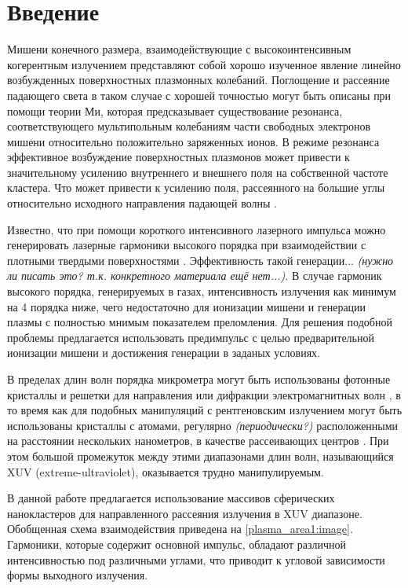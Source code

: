 \section{Введение}

Мишени конечного размера, взаимодействующие с высокоинтенсивным когерентным излучением представляют собой хорошо изученное явление линейно возбужденных 
поверхностных плазмонных колебаний. Поглощение и рассеяние падающего света в таком случае с хорошей точностью могут быть описаны при помощи теории Ми, которая предсказывает существование резонанса, соответствующего мультипольным колебаниям части свободных электронов мишени относительно положительно заряженных ионов. В режиме резонанса эффективное возбуждение поверхностных плазмонов может привести к значительному усилению внутреннего и внешнего 
поля на собственной частоте кластера. Что может привести к усилению поля, рассеянного на большие углы относительно исходного направления падающей волны \cite{andreev_lecz}.

Известно, что при помощи короткого интенсивного лазерного импульса можно генерировать лазерные гармоники высокого порядка при взаимодействии с плотными твердыми поверхностями \cite{teubner_gibbon_hoh}. Эффективность такой генерации... \textit{(нужно ли писать это? т.к. конкретного материала ещё нет...)}. В случае гармоник высокого порядка, генерируемых в газах, интенсивность излучения как минимум на 4 порядка ниже, чего недостаточно для ионизации мишени и генерации плазмы с полностью мнимым показателем преломления. Для решения подобной проблемы предлагается использовать предимпульс с целью предварительной ионизации мишени и достижения генерации в заданых условиях. 

В пределах длин волн порядка микрометра могут быть использованы фотонные кристаллы и решетки для направления или дифракции электромагнитных волн \cite{lin_zhang}, в то время как для подобных манипуляций с рентгеновским излучением могут быть использованы кристаллы с атомами, регулярно \textit{(периодически?)} расположенными на расстоянии нескольких нанометров, в качестве рассеивающих центров \cite{batterman_cole}. При этом большой промежуток между этими диапазонами длин волн, называющийся XUV (extreme-ultraviolet), оказывается трудно манипулируемым.

В данной работе предлагается использование массивов сферических нанокластеров для направленного рассеяния излучения в XUV диапазоне. Обобщенная схема взаимодействия приведена на \autoref{plasma_area1:image}. Гармоники, которые содержит основной импульс, обладают различной интенсивностью под различными углами, что приводит к угловой зависимости формы выходного излучения.

